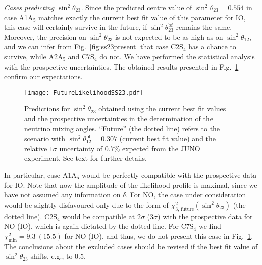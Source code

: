 \documentclass[11pt,a4paper]{article}
\def\th{\theta}
\numberwithin{equation}{section}
\begin{document}
 \textit{Cases predicting $\sin^2\th_{23}$.} 
Since the predicted centre value of $\sin^2\th_{23} = 0.554$ in case A1A$_5$ 
matches exactly the current best fit value of this parameter for IO, 
this case will certainly survive in the future, 
if $\sin^2\th_{23}^\mathrm{bf}$ remains the same.
Moreover, the precision on $\sin^2\th_{23}$ is not expected to be as high as on $\sin^2\th_{12}$, and we can infer from Fig.~\ref{fig:ss23present} that 
case C2S$_4$ has a chance to survive, while A2A$_5$ and C7S$_4$ do not. 
We have performed the statistical analysis with the prospective uncertainties. 
The obtained results presented in Fig.~\ref{fig:ss23future} confirm our expectations.
\begin{figure}
\centering
\texttt{[image: FutureLikelihoodSS23.pdf]}
\caption{Predictions for $\sin^2\th_{23}$ obtained using 
the current best fit values and the prospective uncertainties in the determination 
of the neutrino mixing angles. 
``Future'' (the dotted line) refers to the scenario with $\sin^2\th_{12}^\mathrm{bf} = 0.307$ 
(current best fit value) and the relative $1\sigma$ uncertainty of $0.7\%$ expected from the JUNO experiment. See text for further details.}
\label{fig:ss23future}
\end{figure}
%
In particular, case A1A$_5$ would be perfectly compatible with the 
prospective data for IO. Note that now the amplitude of the likelihood profile 
is maximal, since we have not assumed any information on $\delta$. 
For NO, the case under consideration would be slightly disfavoured
only due to the form of $\chi_\mathrm{3,\,future}^2\left(\sin^2\th_{23}\right)$ 
(the dotted line). 
C2S$_4$ would be compatible at $2\sigma$ ($3\sigma$) with the 
prospective data for NO (IO), which is again dictated by the dotted line. 
For C7S$_4$ we find $\chi^2_\mathrm{min} = 9.3~(15.5)$ for NO (IO), 
and thus, we do not present this case in Fig.~\ref{fig:ss23future}.
The conclusions about the excluded cases should be revised if 
the best fit value of $\sin^2\th_{23}$ shifts, e.g., to 0.5.
\end{document}
